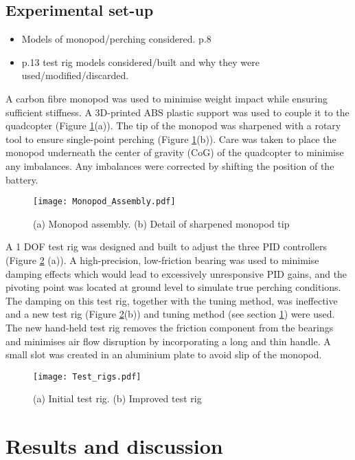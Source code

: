 \documentclass[12pt,a4paper]{article}
\begin{document}
\subsection{Experimental set-up}
\begin{itemize}
\item Models of monopod/perching considered. p.8
\item p.13 test rig models considered/built and why they were used/modified/discarded.
\end{itemize}
A carbon fibre monopod was used to minimise weight impact while ensuring sufficient stiffness. A 3D-printed ABS plastic support was used to couple it to the quadcopter (Figure \ref{fig5}(a)). The tip of the monopod was sharpened with a rotary tool to ensure single-point perching (Figure \ref{fig5}(b)). Care was taken to place the monopod underneath the center of gravity (CoG) of the quadcopter to minimise any imbalances. Any imbalances were corrected by shifting the position of the battery.

\begin{figure}[h!]
\centering
 \texttt{[image: Monopod\_Assembly.pdf]}
  \caption{(a) Monopod assembly. (b) Detail of sharpened monopod tip}
  \label{fig5}
\end{figure}

A 1 DOF test rig was designed and built to adjust the three PID controllers (Figure \ref{fig6} (a)). A high-precision, low-friction bearing was used to minimise damping effects which would lead to excessively unresponsive PID gains, and the pivoting point was located at ground level to simulate true perching conditions. The damping on this test rig, together with the tuning method, was ineffective and a new test rig (Figure \ref{fig6}(b)) and tuning method (see section \ref{Results and discussion}) were used. The new hand-held test rig removes the friction component from the bearings and minimises air flow disruption by incorporating a long and thin handle. A small slot was created in an aluminium plate to avoid slip of the monopod.


\begin{figure}[h!]
\centering
 \texttt{[image: Test\_rigs.pdf]}
  \caption{(a) Initial test rig. (b) Improved test rig}
  \label{fig6}
\end{figure}

\section{Results and discussion} \label{Results and discussion}
\end{document}
